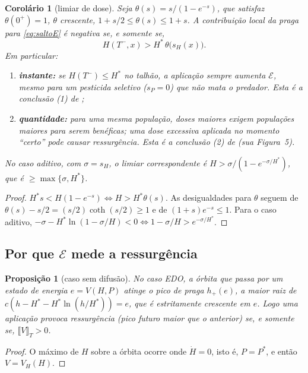 \documentclass[11pt,a4paper]{article}
\numberwithin{equation}{section}
\newtheorem{proposicao}[teorema]{Proposição}
\newtheorem{corolario}[teorema]{Corolário}
\theoremstyle{definition}
\theoremstyle{remark}
\newcommand{\E}{\mathcal{E}}
\newcommand{\jump}[1]{\llbracket #1 \rrbracket}
\newcommand{\Hs}{H^{*}}
\newcommand{\Ps}{P^{*}}
\begin{document}
\begin{corolario}[limiar de dose]\label{cor:limiar}
Seja $\theta(s)=s/(1-e^{-s})$, que satisfaz $\theta(0^+)=1$, $\theta$ crescente,
$1+s/2\le\theta(s)\le1+s$. A contribuição local da praga para \eqref{eq:saltoE} é negativa se, e
somente se,
\begin{equation}\label{eq:limiar}
H(T^-,x)>\Hs\,\theta\big(s_H(x)\big).
\end{equation}
Em particular:
\begin{enumerate}
\item[(i)] \textbf{instante:} se $H(T^-)\le\Hs$ no talhão, a aplicação sempre aumenta $\E$, mesmo
para um pesticida seletivo ($s_P=0$) que não mata o predador. Esta é a conclusão (1) de
\cite{LiYang};
\item[(ii)] \textbf{quantidade:} para uma mesma população, doses maiores exigem populações maiores
para serem benéficas; uma dose excessiva aplicada no momento ``certo'' pode causar ressurgência.
Esta é a conclusão (2) de \cite{LiYang} (sua Figura~5).
\end{enumerate}
No caso aditivo, com $\sigma=s_H$, o limiar correspondente é $H>\sigma/(1-e^{-\sigma/\Hs})$, que é
$\ge\max\{\sigma,\Hs\}$.
\end{corolario}

\begin{proof}
$\Hs s<H(1-e^{-s})\iff H>\Hs\theta(s)$. As desigualdades para $\theta$ seguem de
$\theta(s)-s/2=(s/2)\coth(s/2)\ge1$ e de $(1+s)e^{-s}\le1$. Para o caso aditivo,
$-\sigma-\Hs\ln(1-\sigma/H)<0\iff1-\sigma/H>e^{-\sigma/\Hs}$.
\end{proof}

\subsection{Por que $\E$ mede a ressurgência}

\begin{proposicao}[caso sem difusão]\label{prop:edo}
No caso EDO, a órbita que passa por um estado de energia $e=V(H,P)$ atinge o pico de praga
$h_+(e)$, a maior raiz de $c(h-\Hs-\Hs\ln(h/\Hs))=e$, que é estritamente crescente em $e$.
Logo uma aplicação provoca ressurgência (pico futuro maior que o anterior) se, e somente se,
$\jump{V}_T>0$.
\end{proposicao}

\begin{proof}
O máximo de $H$ sobre a órbita ocorre onde $\dot H=0$, isto é, $P=\Ps$, e então
$V=V_H(H)$.
\end{proof}
\end{document}
